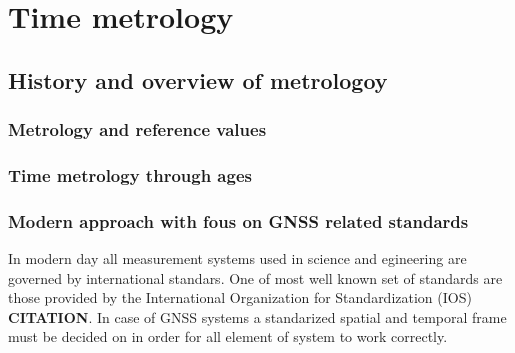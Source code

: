 \setchapterpreamble[u]{\margintoc}
\chapter[Time metrology]{Time metrology\footnotemark[0]}


\section{History and overview of metrologoy}

\subsection{Metrology and reference values}

\subsection{Time metrology through ages}

\subsection{Modern approach with fous on GNSS related standards}
In modern day all measurement systems used in science and egineering are governed by international
standars. One of most well known set of standards are those provided by the International 
Organization for Standardization (IOS) \textbf{CITATION}.
In case of GNSS systems a standarized spatial and temporal frame must be decided on in order
for all element of system to work correctly.

